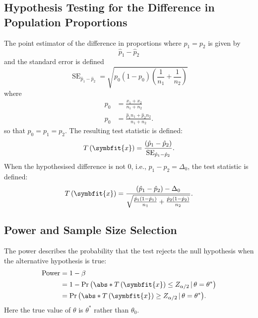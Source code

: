 \documentclass{article}
\begin{document}
\subsection{Hypothesis Testing for the Difference in Population Proportions}
The point estimator of the difference in proportions where \(p_1 = p_2\) is given by
\begin{equation*}
    \hat{p}_1 - \hat{p}_2
\end{equation*}
and the standard error is defined
\begin{equation*}
    \operatorname{SE}_{\hat{p}_1 - \hat{p}_2} = \sqrt{p_0 \left( 1 - p_0 \right) \left( \frac{1}{n_1} + \frac{1}{n_2} \right)}
\end{equation*}
where
\begin{align*}
    p_0 & = \frac{x_1 + x_2}{n_1 + n_2}                      \\
    p_0 & = \frac{\hat{p}_1 n_1 + \hat{p}_2 n_2}{n_1 + n_2}.
\end{align*}
so that \(p_0 = p_1 = p_2\).
The resulting test statistic is defined:
\begin{equation*}
    T\left( \symbfit{x} \right) = \frac{\left( \hat{p}_1 - \hat{p}_2 \right)}{\operatorname{SE}_{\hat{p}_1 - \hat{p}_2}}.
\end{equation*}
When the hypothesised difference is not 0, i.e., \(p_1 - p_2 = \Delta_0\), the test statistic is defined:
\begin{equation*}
    T\left( \symbfit{x} \right) = \frac{\left( \hat{p}_1 - \hat{p}_2 \right) - \Delta_0}{\sqrt{\frac{\hat{p}_1 \left( 1 - \hat{p}_1 \right)}{n_1} + \frac{\hat{p}_2 \left( 1 - \hat{p}_2 \right)}{n_2}}}.
\end{equation*}
\subsection{Power and Sample Size Selection}
The power describes the probability that the test rejects the null hypothesis when the alternative hypothesis is true:
\begin{align*}
    \operatorname{Power} & = 1 - \beta                                                                                                   \\
                         & = 1 - \Pr{\left( \abs*{T\left( \symbfit{x} \right)} \leq Z_{\alpha/2} \,\vert\, \theta = \theta^\ast \right)} \\
                         & = \Pr{\left( \abs*{T\left( \symbfit{x} \right)} \geq Z_{\alpha/2} \,\vert\, \theta = \theta^\ast \right)}.
\end{align*}
Here the true value of \(\theta\) is \(\theta^\ast\) rather than \(\theta_0\).
\end{document}
